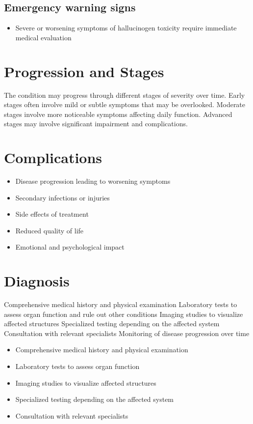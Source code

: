 \subsection{Emergency warning signs}
\begin{itemize}[noitemsep]
  \item Severe or worsening symptoms of hallucinogen toxicity require immediate medical evaluation
\end{itemize}
\section{Progression and Stages}
The condition may progress through different stages of severity over time. Early stages often involve mild or subtle symptoms that may be overlooked. Moderate stages involve more noticeable symptoms affecting daily function. Advanced stages may involve significant impairment and complications.
\section{Complications}
\begin{itemize}[noitemsep]
  \item Disease progression leading to worsening symptoms
  \item Secondary infections or injuries
  \item Side effects of treatment
  \item Reduced quality of life
  \item Emotional and psychological impact
\end{itemize}
\section{Diagnosis}
Comprehensive medical history and physical examination Laboratory tests to assess organ function and rule out other conditions Imaging studies to visualize affected structures Specialized testing depending on the affected system Consultation with relevant specialists Monitoring of disease progression over time

\begin{itemize}[noitemsep]
  \item Comprehensive medical history and physical examination
  \item Laboratory tests to assess organ function
  \item Imaging studies to visualize affected structures
  \item Specialized testing depending on the affected system
  \item Consultation with relevant specialists
\end{itemize}
